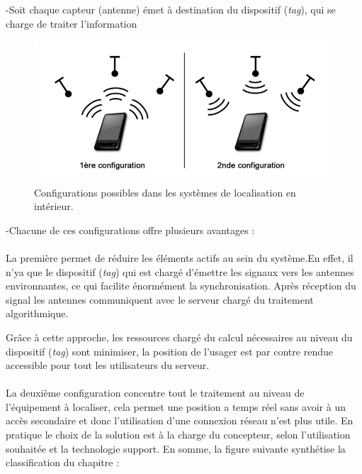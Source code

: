 \documentclass[12pt,a4paper]{report}
\begin{document}
	-Soit chaque capteur (antenne) émet à destination du dispositif (\textit{tag}), qui se charge de traiter l’information
	
		\begin{figure}[H]
		\centering
		\includegraphics[width=0.8\linewidth]{Pics/architecture.PNG}
		\caption{Configurations possibles dans les systèmes de localisation en intérieur.}
		\label{fig:architecture}
	
\end{figure}

-Chacune de ces configurations offre plusieurs avantages :

\paragraph{}
La première permet de réduire les éléments actifs au sein du système.En effet, il n'ya que le dispositif (\textit{tag}) qui est chargé d’émettre les signaux  vers les antennes environnantes, ce qui facilite énormément la synchronisation. Après réception du signal les antennes communiquent avec le serveur chargé du traitement algorithmique.


Grâce à cette approche, les ressources chargé du calcul nécessaires au niveau du dispositif (\textit{tag}) sont minimiser, la position de l’usager est par contre rendue accessible pour tout les utilisateurs du serveur.

\paragraph{} La deuxième configuration concentre tout le traitement au niveau de l’équipement à localiser, cela permet une position a temps réel sans avoir à un accès secondaire et donc l'utilisation d'une connexion réseau n'est plus utile.
En pratique le choix de la solution est à la charge du concepteur, selon l’utilisation souhaitée et la technologie support. En somme, la figure suivante synthétise la classification du chapitre :
\end{document}
